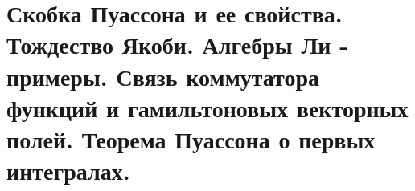 \section{Скобка Пуассона и ее свойства. Тождество Якоби. Алгебры Ли - примеры. Связь коммутатора функций и гамильтоновых векторных полей. Теорема Пуассона о первых интегралах.}\label{chasec25}



\newpage